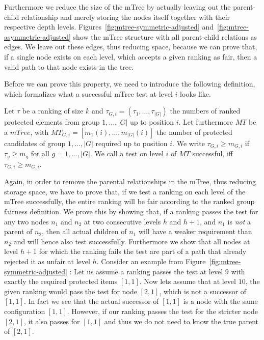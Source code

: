 Furthermore we reduce the size of the mTree by actually leaving out the parent-child relationship and merely storing the nodes itself together with their respective depth levels.
%
Figures~\ref{fig:mtree-symmetric-adjusted} and~\ref{fig:mtree-asymmetric-adjusted} show the mTree structure with all parent-child relations as edges.
%
We leave out these edges, thus reducing space, because we can prove that, if a single node exists on each level, which accepts a given ranking as fair, then a valid path to that node exists in the tree.

Before we can prove this property, we need to introduce the following definition, which formalizes what a successful mTree test at level $i$ looks like.
%
\begin{definition}
\label{def:valid-mtree-test}
Let $\tau$ be a ranking of size $k$ and $\tau_{G,i}=(\tau_{1},\ldots,\tau_{|G|})$ the numbers of ranked protected elements from group $1,\ldots,|G|$ up to position $i$.
%
Let furthermore $MT$ be a $mTree$, with $MT_{G,i}=[m_1(i),\ldots,m_{|G|}(i)]$ the number of protected candidates of group $1,\ldots,|G|$ required up to position $i$.
%
We write $\tau_{G,i} \geq m_{G,i}$ if $\tau_g \geq m_g$ for all $g=1,\ldots,|G|$.
%
We call a test on level $i$ of $MT$ successful, iff $\tau_{G,i} \geq m_{G,i}$.
\end{definition}
%
Again, in order to remove the parental relationships in the mTree, thus reducing storage space, we have to prove that, if we test a ranking on each level of the mTree successfully, the entire ranking will be fair according to the ranked group fairness definition.
%
We prove this by showing that, if a ranking passes the test for any two nodes $n_1$ and $n_2$ at two consecutive levels $h$ and $h+1$, and $n_1$ is \emph{not} a parent of $n_2$, then all actual children of $n_1$ will have a weaker requirement than $n_2$ and will hence also test successfully.
%
Furthermore we show that all nodes at level $h+1$ for which the ranking fails the test are part of a path that already rejected it as unfair at level $h$.
%
Consider an example from Figure~\ref{fig:mtree-symmetric-adjusted} : Let us assume a ranking passes the test at level $9$ with exactly the required protected items $[1,1]$.
%
Now lets assume that at level $10$, the given ranking would pass the test for node $[2,1]$, which is not a successor of $[1,1]$.
%
In fact we see that the actual successor of $[1,1]$ is a node with the same configuration $[1,1]$.
%
However, if our ranking passes the test for the stricter node $[2,1]$, it also passes for $[1,1]$ and thus we do not need to know the true parent of $[2,1]$.
